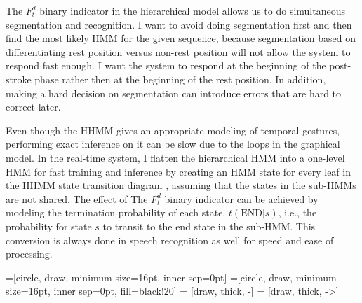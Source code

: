 The $F_t^d$ binary indicator in the hierarchical model allows us to do
simultaneous segmentation and recognition. I want to avoid doing segmentation first and then find the most
likely HMM for the given sequence, because segmentation based on
differentiating rest position versus non-rest position will not allow the system
to respond fast enough. I want the system to respond at the beginning of the
post-stroke phase rather then at the beginning of the rest position. In
addition, making a hard decision on segmentation can introduce errors that
are hard to correct later. 

Even though the HHMM gives an appropriate modeling of temporal gestures,
performing exact inference on it can be slow due to the loops in the graphical
model. In the real-time system, I flatten the hierarchical HMM into a one-level
HMM for fast training and inference by creating an HMM state for
every leaf in the HHMM state transition diagram \cite{murphy02}, assuming that
the states in the sub-HMMs are not shared. The effect of The $F_t^d$ binary
indicator can be achieved by modeling the termination probability of each
state, $t(\text{END}|s)$, i.e., the probability for state $s$ to transit to the
end state in the sub-HMM.
This conversion is always done in speech recognition as well for speed and ease of processing.

=[circle, draw, minimum size=16pt, inner sep=0pt]
=[circle, draw, minimum size=16pt, inner sep=0pt,
               fill=black!20] 
 = [draw, thick, -]
 = [draw, thick, ->]


